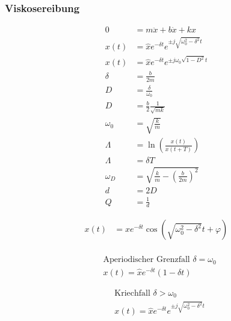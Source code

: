 \subsubsection{Viskosereibung}
\begin{multicols}{2}{}
\begin{align*}
0&=m\ddot{x}+b\dot{x}+kx\\
x(t)&=\hat{x}e^{-\delta t}e^{\pm j\sqrt{\omega_0^2-\delta^2}t}\\
x(t)&=\hat{x}e^{-\delta t}e^{\pm j\omega_0\sqrt{1-D^2}t}\\
\delta&=\frac{b}{2m}\\
D&=\frac{\delta}{\omega_0}\\
D&=\frac{b}{2}\frac{1}{\sqrt{mk}}\\
\omega_0&=\sqrt{\frac{k}{m}}\\
\Lambda&=\ln\left(\frac{x(t)}{x(t+T)}\right)\\
\Lambda&=\delta T\\
\omega_D&=\sqrt{\frac{k}{m}-\left(\frac{b}{2m}\right)^2}\\
d&=2D\\
Q&=\frac{1}{d}
\end{align*}

{
\begin{align*}
x(t)&=\hat{x}e^{-\delta t}\cos(\sqrt{\omega_0^2-\delta^2}t+\varphi)\\
\end{align*}

\begin{align*}
&\text{Aperiodischer Grenzfall $\delta=\omega_0$}\\
&x(t)=\hat{x}e^{-\delta t}(1-\delta t)
\end{align*}

\begin{align*}
&\text{Kriechfall $\delta>\omega_0$}\\
&x(t)=\hat{x}e^{-\delta t}e^{\pm j\sqrt{\omega_0^2-\delta^2}t}
\end{align*}
}
\hfill

\end{multicols}